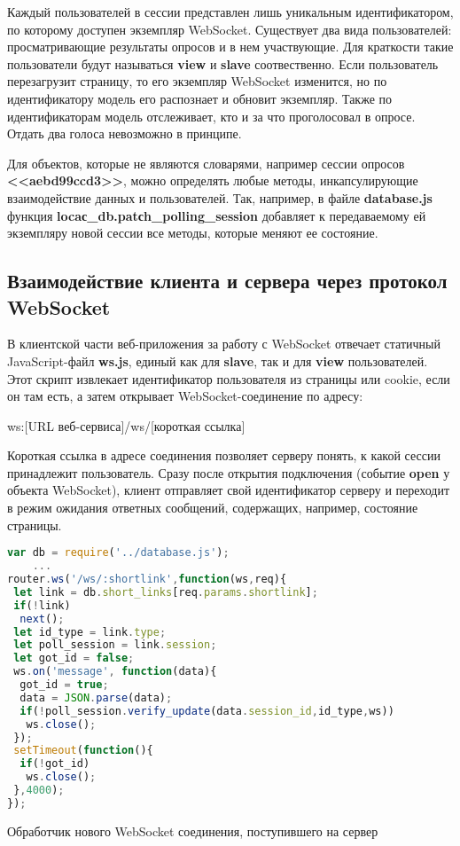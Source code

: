 Каждый пользователей в сессии представлен лишь уникальным идентификатором, по которому доступен экземпляр WebSocket. Существует два вида пользователей: просматривающие результаты опросов и в нем участвующие. Для краткости такие пользователи будут называться \textbf{view} и \textbf{slave} соотвественно. Если пользователь перезагрузит страницу, то его экземпляр WebSocket изменится, но по идентификатору модель его распознает и обновит экземпляр. Также по идентификаторам модель отслеживает, кто и за что проголосовал в опросе. Отдать два голоса невозможно в принципе. 
 
 Для объектов, которые не являются словарями, например сессии опросов \textbf{<<aebd99ccd3>>}, можно определять любые методы, инкапсулирующие взаимодействие данных и пользователей. Так, например, в файле \textbf{database.js} функция \textbf{locaс\_db.patсh\_polling\_session} добавляет к передаваемому ей экземпляру новой сессии все методы, которые меняют ее состояние. 
 
\subsection{Взаимодействие клиента и сервера через протокол WebSocket}
В клиентской части веб-приложения за работу с WebSocket отвечает статичный JavaScript-файл \textbf{ws.js}, единый как для \textbf{slave}, так и для \textbf{view} пользователей. Этот скрипт извлекает идентификатор пользователя из страницы или cookie, если он там есть, а затем открывает WebSocket-соединение по адресу:     
 \begin{Verb}
 	ws:[URL веб-сервиса]/ws/[короткая ссылка]  
 \end{Verb}

Короткая ссылка в адресе соединения позволяет серверу понять, к какой сессии принадлежит пользователь. Сразу после открытия подключения (событие \textbf{open} у объекта WebSocket), клиент отправляет свой идентификатор серверу и переходит в режим ожидания ответных сообщений, содержащих, например, состояние страницы.

\begin{ListingEnv}[H]
	\begin{lstlisting}[language=JavaScript]
var db = require('../database.js');
	...
router.ws('/ws/:shortlink',function(ws,req){
 let link = db.short_links[req.params.shortlink];
 if(!link)
  next();
 let id_type = link.type;
 let poll_session = link.session;
 let got_id = false;
 ws.on('message', function(data){
  got_id = true;
  data = JSON.parse(data);
  if(!poll_session.verify_update(data.session_id,id_type,ws))
   ws.close();
 });
 setTimeout(function(){
  if(!got_id)
   ws.close();
 },4000);
});
\end{lstlisting}
\caption{Обработчик нового WebSocket соединения, поступившего на сервер}
\label{list:poll-ws}
\end{ListingEnv}

